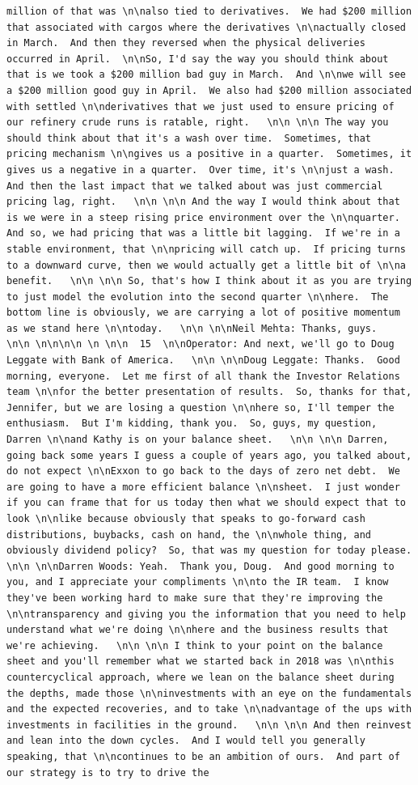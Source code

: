\documentclass[
  letterpaper,
  DIV=11,
  numbers=noendperiod]{scrreprt}
\begin{document}
\begin{verbatim}
million of that was \n\nalso tied to derivatives.  We had $200 million that associated with cargos where the derivatives \n\nactually closed in March.  And then they reversed when the physical deliveries occurred in April.  \n\nSo, I'd say the way you should think about that is we took a $200 million bad guy in March.  And \n\nwe will see a $200 million good guy in April.  We also had $200 million associated with settled \n\nderivatives that we just used to ensure pricing of our refinery crude runs is ratable, right.   \n\n \n\n The way you should think about that it's a wash over time.  Sometimes, that pricing mechanism \n\ngives us a positive in a quarter.  Sometimes, it gives us a negative in a quarter.  Over time, it's \n\njust a wash.  And then the last impact that we talked about was just commercial pricing lag, right.   \n\n \n\n And the way I would think about that is we were in a steep rising price environment over the \n\nquarter.  And so, we had pricing that was a little bit lagging.  If we're in a stable environment, that \n\npricing will catch up.  If pricing turns to a downward curve, then we would actually get a little bit of \n\na benefit.   \n\n \n\n So, that's how I think about it as you are trying to just model the evolution into the second quarter \n\nhere.  The bottom line is obviously, we are carrying a lot of positive momentum as we stand here \n\ntoday.   \n\n \n\nNeil Mehta: Thanks, guys.   \n\n \n\n\n\n \n \n\n  15  \n\nOperator: And next, we'll go to Doug Leggate with Bank of America.   \n\n \n\nDoug Leggate: Thanks.  Good morning, everyone.  Let me first of all thank the Investor Relations team \n\nfor the better presentation of results.  So, thanks for that, Jennifer, but we are losing a question \n\nhere so, I'll temper the enthusiasm.  But I'm kidding, thank you.  So, guys, my question, Darren \n\nand Kathy is on your balance sheet.   \n\n \n\n Darren, going back some years I guess a couple of years ago, you talked about, do not expect \n\nExxon to go back to the days of zero net debt.  We are going to have a more efficient balance \n\nsheet.  I just wonder if you can frame that for us today then what we should expect that to look \n\nlike because obviously that speaks to go-forward cash distributions, buybacks, cash on hand, the \n\nwhole thing, and obviously dividend policy?  So, that was my question for today please.   \n\n \n\nDarren Woods: Yeah.  Thank you, Doug.  And good morning to you, and I appreciate your compliments \n\nto the IR team.  I know they've been working hard to make sure that they're improving the \n\ntransparency and giving you the information that you need to help understand what we're doing \n\nhere and the business results that we're achieving.   \n\n \n\n I think to your point on the balance sheet and you'll remember what we started back in 2018 was \n\nthis countercyclical approach, where we lean on the balance sheet during the depths, made those \n\ninvestments with an eye on the fundamentals and the expected recoveries, and to take \n\nadvantage of the ups with investments in facilities in the ground.   \n\n \n\n And then reinvest and lean into the down cycles.  And I would tell you generally speaking, that \n\ncontinues to be an ambition of ours.  And part of our strategy is to try to drive the 
\end{verbatim}
\end{document}
